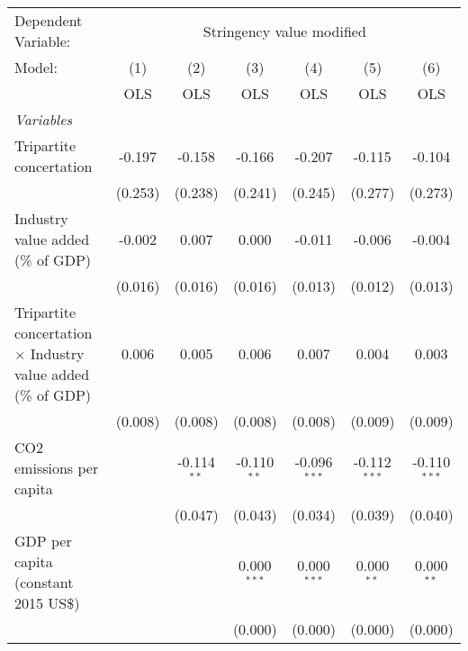
\begingroup
\centering
\begin{tabular}{lcccccc}
   \toprule
   Dependent Variable: & \multicolumn{6}{c}{Stringency value modified}\\
   Model:                                                              & (1)     & (2)           & (3)           & (4)            & (5)            & (6)\\  
                                                                       &  OLS    & OLS           & OLS           & OLS            & OLS            & OLS\\  
   \midrule
   \emph{Variables}\\
   Tripartite concertation                                             & -0.197  & -0.158        & -0.166        & -0.207         & -0.115         & -0.104\\   
                                                                       & (0.253) & (0.238)       & (0.241)       & (0.245)        & (0.277)        & (0.273)\\   
   Industry value added (\% of GDP)                                    & -0.002  & 0.007         & 0.000         & -0.011         & -0.006         & -0.004\\   
                                                                       & (0.016) & (0.016)       & (0.016)       & (0.013)        & (0.012)        & (0.013)\\   
   Tripartite concertation $\times$ Industry value added (\% of GDP)   & 0.006   & 0.005         & 0.006         & 0.007          & 0.004          & 0.003\\   
                                                                       & (0.008) & (0.008)       & (0.008)       & (0.008)        & (0.009)        & (0.009)\\   
   CO2 emissions per capita                                            &         & -0.114$^{**}$ & -0.110$^{**}$ & -0.096$^{***}$ & -0.112$^{***}$ & -0.110$^{***}$\\   
                                                                       &         & (0.047)       & (0.043)       & (0.034)        & (0.039)        & (0.040)\\   
   GDP per capita (constant 2015 US\$)                                 &         &               & 0.000$^{***}$ & 0.000$^{***}$  & 0.000$^{**}$   & 0.000$^{**}$\\   
                                                                       &         &               & (0.000)       & (0.000)        & (0.000)        & (0.000)\\   

\end{tabular}
